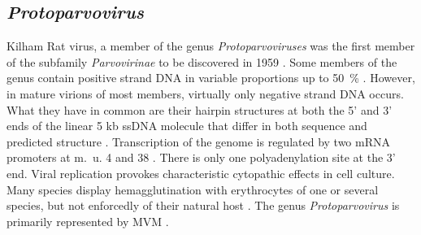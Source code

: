 


\subsection{\textit{Protoparvovirus}}
\label{CPV}
Kilham Rat virus, a member of the genus \textit{Protoparvoviruses} was the first member of the subfamily \textit{Parvovirinae} to be discovered in 1959 \cite{pmid13669314}. Some members of the genus contain positive strand DNA in variable proportions up to 50~\% \cite{pmid6694260}. However, in mature virions of most members, virtually only negative strand DNA occurs. What they have in common are their hairpin structures at both the 5’ and 3’ ends of the linear 5 kb ssDNA molecule that differ in both sequence and predicted structure \cite{pmid6298737}. Transcription of the genome is regulated by two mRNA promoters at m.~u. 4 and 38 \cite{pmid6828378}. There is only one polyadenylation site at the 3’ end. 
Viral replication provokes characteristic cytopathic effects in cell culture. Many species display hemagglutination with erythrocytes of one or several species, but not enforcedly of their natural host \cite{pmid5083410}. The genus \textit{Protoparvovirus} is primarily represented by MVM \cite{icvt, protoparvovirus}.       


